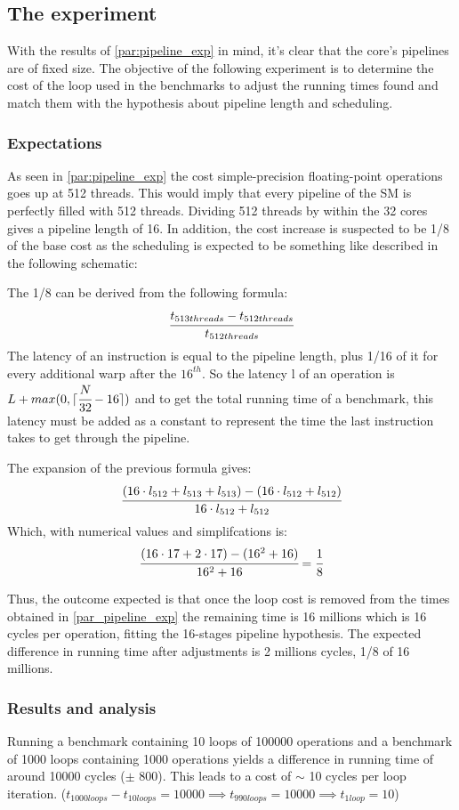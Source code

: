 \documentclass{article}
\DeclarePairedDelimiter\ceil{\lceil}{\rceil}
\begin{document}
    \subsection{The experiment}
    With the results of \ref{par:pipeline_exp} in mind, it's clear that the core's pipelines
    are of fixed size. The objective of the following experiment is to determine the cost of
    the loop used in the benchmarks to adjust the running times found and match them with
    the hypothesis about pipeline length and scheduling. 
	\subsubsection{Expectations}
	As seen in \ref{par:pipeline_exp} the cost simple-precision floating-point
    operations goes up at 512 threads. This would imply that every pipeline of
    the SM is perfectly filled with 512 threads. Dividing 512 threads by within
    the 32 cores gives a pipeline length of 16. In addition, the cost increase
    is suspected to be 1/8 of the base cost as the scheduling is expected to be
    something like described in the following schematic:

    The 1/8 can be derived from the following formula:
    \[ \cfrac{t_{513threads} - t_{512threads}}{t_{512threads}} \]
    The latency of an instruction is equal to the pipeline length, plus 1/16 of
    it for every additional warp after the $16^{th}$. So the latency l of an 
    operation is $L + max(0, \ceil{\cfrac{N}{32} -16})$ and to get the total
    running time of a benchmark, this latency must be added as a constant to
    represent the time the last instruction takes to get through the pipeline.

    The expansion of the previous formula gives:
    \[ \cfrac{(16\cdot l_{512} + l_{513} + l_{513}) - (16\cdot l_{512} + l_{512})}{16\cdot l_{512} + l_{512}} \]
    Which, with numerical values and simplifcations is:
    \[ \cfrac{(16\cdot 17 + 2\cdot 17) - (16^2 + 16)}{16^2 + 16} = \cfrac{1}{8}\] 

    Thus, the outcome expected is that once the loop cost is removed from the 
    times obtained in \ref{par_pipeline_exp} the remaining time is 16 millions
    which is 16 cycles per operation, fitting the 16-stages pipeline hypothesis.
    The expected difference in running time after adjustments is 2 millions cycles,
    1/8 of 16 millions.

	\subsubsection{Results and analysis}
    Running a benchmark containing 10 loops of 100000 operations and a benchmark
    of 1000 loops containing 1000 operations yields a difference in running time of
    around 10000 cycles ($\pm$ 800). This leads to a cost of $\sim$ 10 cycles per
    loop iteration. ($t_{1000loops} - t_{10loops} = 10000 \implies t_{990loops} = 10000
    \implies t_{1loop} = 10$)
    
\end{document}
